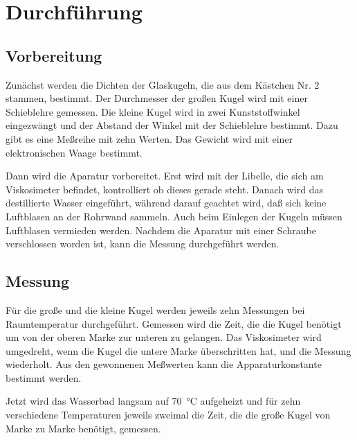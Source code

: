 
\section{Durchführung}

\subsection{Vorbereitung}

Zunächst werden die Dichten der Glaskugeln, die aus dem Kästchen Nr. 2
stammen, bestimmt. Der Durchmesser der großen Kugel wird mit einer
Schieblehre gemessen. Die kleine Kugel wird in zwei Kunststoffwinkel
eingezwängt und der Abstand der Winkel mit der Schieblehre
bestimmt. Dazu gibt es eine Meßreihe mit zehn Werten. Das Gewicht wird
mit einer elektronischen Waage bestimmt.

Dann wird die Aparatur vorbereitet. Erst wird mit der Libelle, die sich
am Viskosimeter befindet, kontrolliert ob dieses gerade steht. Danach
wird das destillierte Wasser eingeführt, während darauf geachtet wird,
daß sich keine Luftblasen an der Rohrwand sammeln. Auch beim Einlegen
der Kugeln müssen Luftblasen vermieden werden. Nachdem die Aparatur mit
einer Schraube verschlossen worden ist, kann die Messung durchgeführt
werden.

\subsection{Messung}

Für die große und die kleine Kugel werden jeweils zehn Messungen bei
Raumtemperatur durchgeführt. Gemessen wird die Zeit, die die Kugel
benötigt um von der oberen Marke zur unteren zu gelangen. Das
Viskosimeter wird umgedreht, wenn die Kugel die untere Marke
überschritten hat, und die Messung wiederholt. Aus den gewonnenen
Meßwerten kann die Apparaturkonstante bestimmt werden.

Jetzt wird das Wasserbad langsam auf \SI{70}{\degreeCelsius} aufgeheizt
und für zehn verschiedene Temperaturen jeweils zweimal die Zeit, die die
große Kugel von Marke zu Marke benötigt, gemessen.
